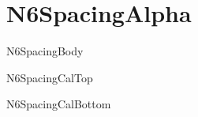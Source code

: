 \documentclass{abntexto-ufc}
\begin{document}
\textual

\section{N6SpacingAlpha}
N6SpacingBody

\vspace{4\baselineskip}
{\onehalfsp
\noindent N6SpacingCalTop\par
\vspace{\baselineskip}
\noindent N6SpacingCalBottom\par
}
\end{document}
